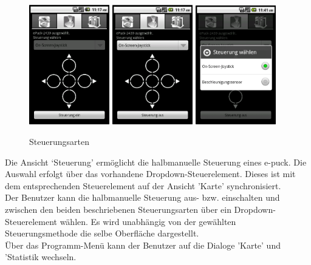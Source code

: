 \documentclass[10pt,a4paper]{article}
\begin{document}
			\begin{figure}[h]
				  \centering
				\includegraphics[width=3.5cm]{screenshots/android2.png}
				\includegraphics[width=3.5cm]{screenshots/android2a.png}
				\includegraphics[width=3.5cm]{screenshots/android2c.png}
  				\caption{Steuerungsarten}
  			\end{figure}	
			
			Die Ansicht `Steuerung' ermöglicht die halbmanuelle Steuerung eines e-puck. Die Auswahl erfolgt über das vorhandene
			Dropdown-Steuerelement. Dieses ist mit dem entsprechenden Steuerelement auf der Ansicht 'Karte' synchronisiert.	\\ 
			Der Benutzer kann die halbmanuelle Steuerung	aus- bzw. einschalten und zwischen den beiden beschriebenen
			Steuerungsarten über ein Dropdown-Steuerelement wählen. Es wird unabhängig von der gewählten Steuerungsmethode die selbe
			Oberfläche dargestellt. \\
			Über das Programm-Menü kann der Benutzer auf die Dialoge 'Karte' und 'Statistik wechseln.
\end{document}
